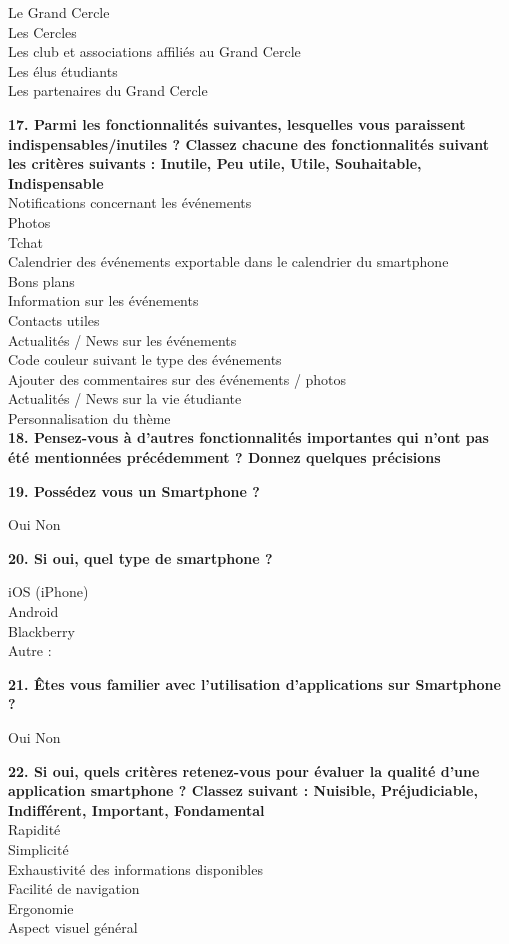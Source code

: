 \documentclass[a4paper, 11px]{article}
\begin{document}
\indent Le Grand Cercle\\
\indent Les Cercles\\
\indent Les club et associations affiliés au Grand Cercle\\
\indent Les élus étudiants\\
\indent Les partenaires du Grand Cercle


\textbf{17. Parmi les fonctionnalités suivantes, lesquelles vous paraissent indispensables/inutiles ?  Classez chacune des fonctionnalités suivant les critères suivants : Inutile, Peu utile, Utile, Souhaitable, Indispensable }\\
\indent Notifications concernant les événements \\							
\indent Photos 							\\
\indent Tchat 							\\
\indent Calendrier des événements exportable dans le calendrier du smartphone 	\\	
\indent Bons plans 		\\					
\indent Information sur les événements 	\\						
\indent Contacts utiles 				\\			
\indent Actualités / News sur les événements\\ 							
\indent Code couleur suivant le type des événements\\ 							
\indent Ajouter des commentaires sur des événements / photos\\ 					
\indent Actualités / News sur la vie étudiante 					\\		
\indent Personnalisation du thème 							\\

\textbf{18. Pensez-vous à d'autres fonctionnalités importantes qui n'ont pas été mentionnées précédemment ? Donnez quelques précisions}

\textbf{19. Possédez vous un Smartphone ? }

    Oui
    Non


\textbf{20. Si oui, quel type de smartphone ?}

\indent iOS (iPhone)\\
\indent Android\\
\indent Blackberry\\
\indent Autre : 


\textbf{21. Êtes vous familier avec l'utilisation d'applications sur Smartphone ? }

    Oui
    Non


\textbf{22. Si oui, quels critères retenez-vous pour évaluer la qualité d'une application smartphone ? Classez suivant : Nuisible, Préjudiciable, Indifférent, Important, Fondamental}\\
\indent Rapidité 		\\					
\indent Simplicité 	\\						
\indent Exhaustivité des informations disponibles 			\\				
\indent Facilité de navigation 							\\
\indent Ergonomie 							\\
\indent Aspect visuel général 					\\		
\end{document}
